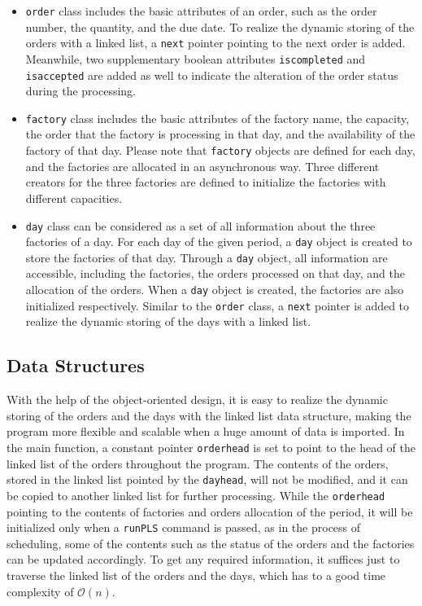 \documentclass[a4paper, 12pt]{article}
\begin{document}
\begin{itemize}
    \item \texttt{order} class includes the basic attributes of an order, such as the order number, the quantity, and the due date. To realize the dynamic storing of the orders with a linked list,
    a \texttt{next} pointer pointing to the next order is added. Meanwhile, two supplementary boolean attributes \texttt{is\textunderscore completed} and \texttt{is\textunderscore accepted} are added as well to indicate the 
    alteration of the order status during the processing. 
    \item \texttt{factory} class includes the basic attributes of the factory name, the capacity, the order that the factory is processing in that day, and the availability of the factory of that day. Please note that 
    \texttt{factory} objects are defined for each day, and the factories are allocated in an asynchronous way. Three different creators for the three factories are defined to initialize the factories with different capacities.
    \item \texttt{day} class can be considered as a set of all information about the three factories of a day. For each day of the given period, a \texttt{day} object is created to store the factories of that day. Through a \texttt{day} object,
    all information are accessible, including the factories, the orders processed on that day, and the allocation of the orders. When a \texttt{day} object is created, the factories are also initialized respectively. Similar 
    to the \texttt{order} class, a \texttt{next} pointer is added to realize the dynamic storing of the days with a linked list.
\end{itemize}

\subsection{Data Structures}

With the help of the object-oriented design, it is easy to realize the dynamic storing of the orders and the days with the linked list data structure, making the program more flexible and scalable 
when a huge amount of data is imported. In the main function, a constant pointer \texttt{order\textunderscore head} is set to point to the head of the linked list of the orders
throughout the program. The contents of the orders, stored in the linked list pointed by the \texttt{day\textunderscore head}, will not be modified, and it can be copied to another linked list for further processing.
While the \texttt{order\textunderscore head} pointing to the contents of factories and orders allocation of the period, it will be initialized only when a \texttt{runPLS} command is passed, as in the process of scheduling, some of the contents such as the status of the orders and the factories can be updated accordingly.
To get any required information, it suffices just to traverse the linked list of the orders and the days, which has to a good time complexity of $\mathcal{O}(n)$.
\end{document}
